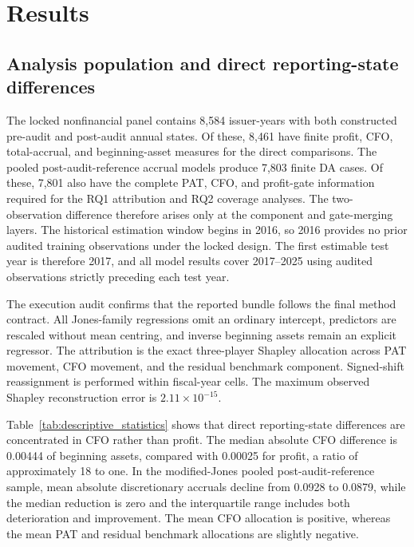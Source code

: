 \section{Results}\label{sec:results}

\subsection{Analysis population and direct reporting-state differences}\label{subsec:results_sample}

The locked nonfinancial panel contains 8,584 issuer-years with both constructed pre-audit and post-audit annual states. Of these, 8,461 have finite profit, CFO, total-accrual, and beginning-asset measures for the direct comparisons. The pooled post-audit-reference accrual models produce 7,803 finite DA cases. Of these, 7,801 also have the complete PAT, CFO, and profit-gate information required for the RQ1 attribution and RQ2 coverage analyses. The two-observation difference therefore arises only at the component and gate-merging layers. The historical estimation window begins in 2016, so 2016 provides no prior audited training observations under the locked design. The first estimable test year is therefore 2017, and all model results cover 2017--2025 using audited observations strictly preceding each test year.

The execution audit confirms that the reported bundle follows the final method contract. All Jones-family regressions omit an ordinary intercept, predictors are rescaled without mean centring, and inverse beginning assets remain an explicit regressor. The attribution is the exact three-player Shapley allocation across PAT movement, CFO movement, and the residual benchmark component. Signed-shift reassignment is performed within fiscal-year cells. The maximum observed Shapley reconstruction error is $2.11\times10^{-15}$.

Table~\ref{tab:descriptive_statistics} shows that direct reporting-state differences are concentrated in CFO rather than profit. The median absolute CFO difference is 0.00444 of beginning assets, compared with 0.00025 for profit, a ratio of approximately 18 to one. In the modified-Jones pooled post-audit-reference sample, mean absolute discretionary accruals decline from 0.0928 to 0.0879, while the median reduction is zero and the interquartile range includes both deterioration and improvement. The mean CFO allocation is positive, whereas the mean PAT and residual benchmark allocations are slightly negative.

